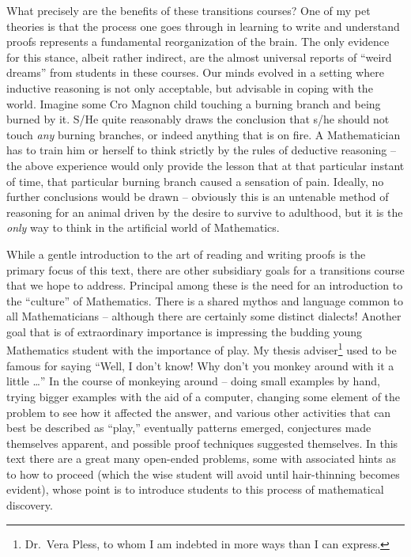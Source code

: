 What precisely are the benefits of these transitions courses?  One of
my pet theories is that the process one goes through in learning to
write and understand proofs represents a fundamental reorganization of
the brain.  The only evidence for this stance, albeit rather indirect,
are the almost universal reports of ``weird dreams'' from students in
these courses.  Our minds evolved in a setting where inductive
reasoning is not only acceptable, but advisable in coping with the
world.  Imagine some Cro Magnon child touching a burning branch and
being burned by it.  S/He quite reasonably draws the conclusion that
s/he should not touch {\em any} burning branches, or indeed anything
that is on fire.  A Mathematician has to train him or herself to think
strictly by the rules of deductive reasoning -- the above experience 
would only provide the lesson that at that particular instant of time,
that particular burning branch caused a sensation of pain.  Ideally,
no further conclusions would be drawn -- obviously this is an
untenable method of reasoning for an animal driven by the desire to
survive to adulthood, but it is the {\em only} way to think in the
artificial world of Mathematics. 

While a gentle introduction to the art of reading and writing proofs
is the primary focus of this text, there are other subsidiary goals
for a transitions course that we hope to address.  Principal among
these is the need for an introduction to the ``culture'' of
Mathematics.  There is a shared mythos and language common to all
Mathematicians -- although there are certainly some distinct dialects!
Another goal that is of extraordinary importance is impressing the
budding young Mathematics student with the importance of play.  My
thesis adviser\footnote{Dr.\ Vera Pless, to whom I am indebted in more
ways than I can express.} used to be famous for saying ``Well, I don't
know! Why don't you monkey around with it a little \ldots ''  In the course
of monkeying around -- doing small examples by hand, trying bigger
examples with the aid of a computer, changing some element of the
problem to see how it affected the answer, and various other
activities that can best be described as ``play,'' eventually patterns
emerged, conjectures made themselves apparent, and possible proof
techniques suggested themselves.  In this text there are a great many
open-ended problems, some with associated hints as to how to proceed
(which the wise student will avoid until hair-thinning becomes
evident), whose point is to introduce students to this process of
mathematical discovery.

